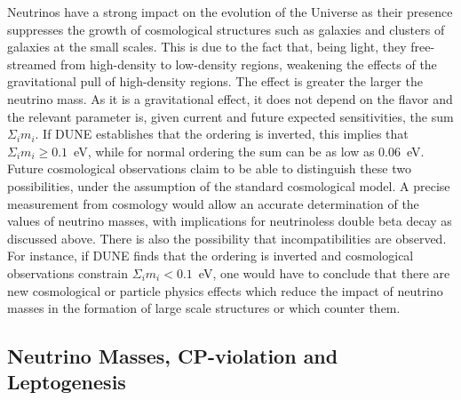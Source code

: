 Neutrinos have a strong impact on the evolution of the Universe as their presence suppresses the growth of cosmological structures such as galaxies and clusters of galaxies at the small scales. This is due to the fact that, being light, they free-streamed from high-density to low-density regions, weakening the effects of the gravitational pull of high-density regions. The effect is greater the larger the neutrino mass. As it is a gravitational effect, it does not depend on the flavor and the relevant parameter is, given current and future expected sensitivities, the sum $\Sigma_i m_i$.  If DUNE establishes that the ordering is inverted, this implies that $\Sigma_i m_i \geq 0.1$~eV, while for normal ordering the sum can be as low as 0.06~eV. Future cosmological observations claim to be able to distinguish these two possibilities, under the assumption of the standard cosmological model. A precise measurement from cosmology would allow an accurate determination of the values of neutrino masses, with implications for neutrinoless double beta decay as discussed above.
There is also the possibility that incompatibilities are observed. For instance, if DUNE finds that the ordering is inverted and cosmological observations constrain $ \Sigma_i m_i < 0.1$~eV, one would have to conclude that there are new cosmological or particle physics effects which reduce the impact of neutrino masses in the formation of large scale structures or which counter them.

\subsection{Neutrino Masses, CP-violation and Leptogenesis}


